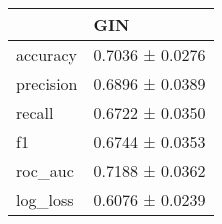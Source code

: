 \begin{tabular}{ll}
\toprule
 & GIN \\
\midrule
accuracy & 0.7036 ± 0.0276 \\
precision & 0.6896 ± 0.0389 \\
recall & 0.6722 ± 0.0350 \\
f1 & 0.6744 ± 0.0353 \\
roc_auc & 0.7188 ± 0.0362 \\
log_loss & 0.6076 ± 0.0239 \\
\bottomrule
\end{tabular}
